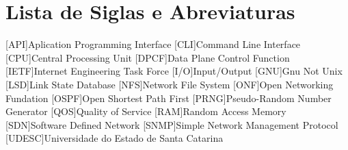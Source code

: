 \chapter*{Lista de Siglas e Abreviaturas}
\begin{acronym}

[API]{Aplication Programming Interface}
[CLI]{Command Line Interface}
[CPU]{Central Processing Unit}
[DPCF]{Data Plane Control Function}
[IETF]{Internet Engineering Task Force}
[I/O]{Input/Output}
[GNU]{Gnu Not Unix}
[LSD]{Link State Database}
[NFS]{Network File System}
[ONF]{Open Networking Fundation}
[OSPF]{Open Shortest Path First}
[PRNG]{Pseudo-Random Number Generator}
[QOS]{Quality of Service}
[RAM]{Random Access Memory}
[SDN]{Software Defined Network}
[SNMP]{Simple Network Management Protocol}
[UDESC]{Universidade do Estado de Santa Catarina}

\end{acronym}
